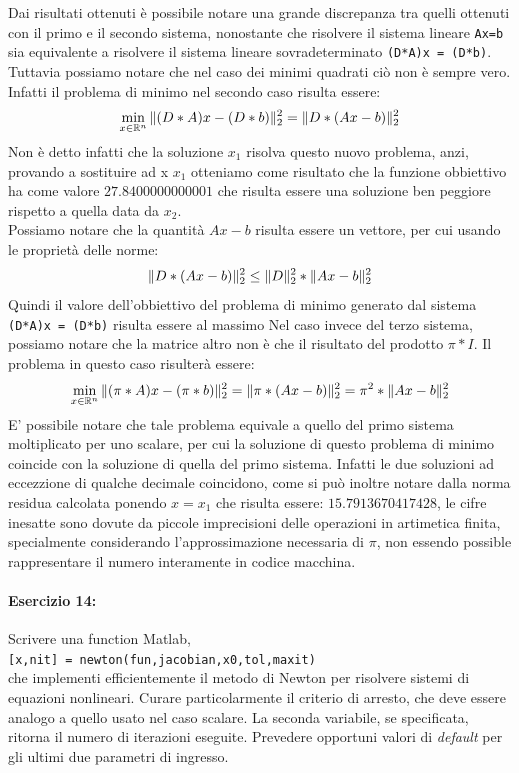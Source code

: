 \documentclass[12pt]{article}
\begin{document}
 Dai risultati ottenuti è possibile notare una grande discrepanza tra quelli ottenuti con il primo e il secondo sistema, nonostante che risolvere il sistema lineare \texttt{Ax=b}
 sia equivalente a risolvere il sistema lineare sovradeterminato \texttt{(D*A)x = (D*b)}. Tuttavia possiamo notare che nel caso dei minimi quadrati ciò non è sempre vero. Infatti il problema di minimo nel secondo caso risulta essere:
 $$\min_{x \in \mathbb{R}^n}\Arrowvert (D*A)x-(D*b) \Arrowvert_{2}^2 = \Arrowvert D*(Ax-b) \Arrowvert_{2}^2$$
 Non è detto infatti che la soluzione \(x_1\) risolva questo nuovo problema, anzi, provando a sostituire ad x \(x_1\) otteniamo come risultato
 che la funzione obbiettivo ha come valore \(27.8400000000001\) che risulta essere una soluzione ben peggiore rispetto a quella data da \(x_2\). \\
 Possiamo notare che la quantità \(Ax-b\) risulta essere un vettore, per cui usando le proprietà delle norme:
 $$\Arrowvert D*(Ax-b) \Arrowvert_{2}^2 \le \Arrowvert D \Arrowvert_{2}^2 * \Arrowvert Ax-b \Arrowvert_{2}^2 $$
 Quindi il valore dell'obbiettivo del problema di minimo generato dal sistema \texttt{(D*A)x = (D*b)} risulta essere al massimo 
 Nel caso invece del terzo sistema, possiamo notare che la matrice altro non è che il risultato del prodotto \(\pi*I\).
Il problema in questo caso risulterà essere:
$$\min_{x \in \mathbb{R}^n}\Arrowvert (\pi*A)x-(\pi*b) \Arrowvert_{2}^2 = \Arrowvert \pi*(Ax-b) \Arrowvert_{2}^2 =\pi^2 * \Arrowvert Ax-b \Arrowvert_{2}^2 $$
E' possibile notare che tale problema equivale a quello del primo sistema moltiplicato per uno scalare, per cui la soluzione di questo problema di minimo coincide con la soluzione di quella del primo sistema. Infatti le due soluzioni ad eccezzione di qualche decimale coincidono, come si può inoltre notare dalla norma residua calcolata
ponendo \(x = x_1\) che risulta essere: \(15.7913670417428\), le cifre inesatte sono dovute da piccole imprecisioni delle operazioni in artimetica finita, specialmente considerando l'approssimazione necessaria di \(\pi\), non essendo possible rappresentare il numero interamente in codice macchina.



\newpage
\paragraph{Esercizio 14:}Scrivere una function Matlab,\\
\texttt{[x,nit] = newton(fun,jacobian,x0,tol,maxit)}\\
che implementi efficientemente il metodo di Newton per risolvere sistemi di equazioni nonlineari. 
Curare particolarmente il criterio di arresto, che deve essere analogo a quello usato nel caso scalare. 
La seconda variabile, se specificata, ritorna il numero di iterazioni eseguite. Prevedere opportuni valori 
di \textit{default} per gli ultimi due parametri di ingresso.
\end{document}
